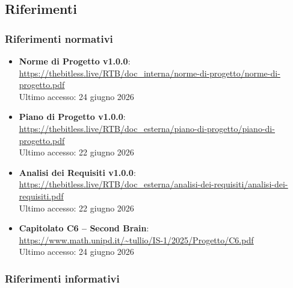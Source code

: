\documentclass[a4paper, 10pt, colorlinks=true, linkcolor=black, urlcolor=blue, citecolor=blue, hidelinks]{article}
\newcommand{\reflink}[1]{{\footnotesize\underline{\url{#1}}}}
\begin{document}
\subsection{Riferimenti}

\subsubsection{Riferimenti normativi}

\begin{itemize}
    \item \textbf{Norme di Progetto v1.0.0}: \\
    \reflink{https://thebitless.live/RTB/doc_interna/norme-di-progetto/norme-di-progetto.pdf} \\
    Ultimo accesso: 24 giugno 2026

    \item \textbf{Piano di Progetto v1.0.0}: \\
    \reflink{https://thebitless.live/RTB/doc_esterna/piano-di-progetto/piano-di-progetto.pdf} \\
    Ultimo accesso: 22 giugno 2026

    \item \textbf{Analisi dei Requisiti v1.0.0}: \\
    \reflink{https://thebitless.live/RTB/doc_esterna/analisi-dei-requisiti/analisi-dei-requisiti.pdf} \\
    Ultimo accesso: 22 giugno 2026

    \item \textbf{Capitolato C6 -- Second Brain}: \\
    \reflink{https://www.math.unipd.it/~tullio/IS-1/2025/Progetto/C6.pdf} \\
    Ultimo accesso: 24 giugno 2026
\end{itemize}

\subsubsection{Riferimenti informativi}
\end{document}
